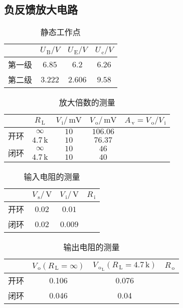 \documentclass{ctexart}
\renewcommand{\rm}{\,\mathrm}
\begin{document}
    \subsection{负反馈放大电路}
    \begin{table}[htbp]
    	\centering
    	\caption{静态工作点}
    	\begin{tabular}{|l|c|c|c|}
    		\hline
    		& \multicolumn{1}{c|}{$U_{\rm{B}}/V$} & \multicolumn{1}{c|}{$U_{\rm{E}}/V$} & \multicolumn{1}{c|}{$U_{\rm{c}}/V$} \\
    		\hline
    		第一级   & $6.85$  & $6.2$   & $6.26$ \\
    		\hline
    		第二级   & $3.222$ & $2.606$ & $9.58$ \\
    		\hline
    	\end{tabular}%
    \end{table}%
    \begin{table}[htbp]
    	\centering
    	\caption{放大倍数的测量}
    	\begin{tabular}{|c|c|c|c|r|}
    		\hline
    		& \multicolumn{1}{c|}{$R_{\rm{L}}$} & \multicolumn{1}{c|}{$V_{\rm{i}}/\rm{mV}$} & \multicolumn{1}{c|}{$V_{\rm{o}}/\rm{mV}$} & \multicolumn{1}{c|}{$A_{\rm{v}}=V_{\rm{o}}/V_{\rm{i}}$} \\
    		\hline
    		\multirow{2}{*}{开环} &   $\infty$    & $10$    & $106.06$ &  \\
    		\cline{2-5}          & $4.7\rm{k}$  & $10$    & $76.37$ &  \\
    		\hline
    		\multirow{2}{*}{闭环} &   $\infty$    & $10$    & $46$    &  \\
    		\cline{2-5}          & $4.7\rm{k}$  & $10$    & $40$    &  \\
    		\hline
    	\end{tabular}%
    \end{table}%
    \begin{table}[htbp]
    	\centering
    	\caption{输入电阻的测量}
    	\begin{tabular}{|l|c|c|c|}
    		\hline
    		& \multicolumn{1}{c|}{$V_{\rm{s}}/\rm{V}$} & \multicolumn{1}{c|}{$V_{\rm{i}}/\rm{V}$} & \multicolumn{1}{c|}{$R_{\rm{i}}$} \\
    		\hline
    		开环    & $0.02$  & $0.01$  &  \\
    		\hline
    		闭环    & $0.02$  & $0.009$ &  \\
    		\hline
    	\end{tabular}%
    \end{table}%
    \begin{table}[htbp]
    	\centering
    	\caption{输出电阻的测量}
    	\begin{tabular}{|c|c|c|c|}
    		\hline
    		& $V_{\rm{o}}(R_{\rm{L}}=\infty)$     & $V_{\rm{o}_{\rm{L}}}(R_{\rm{L}}=4.7\rm{k})$     & \multicolumn{1}{c|}{$R_{\rm{o}}$} \\
    		\hline
    		开环    & 0.106 & 0.076 &  \\
    		\hline
    		闭环    & 0.046 & 0.04  &  \\
    		\hline
    	\end{tabular}%
    \end{table}%
\end{document}
